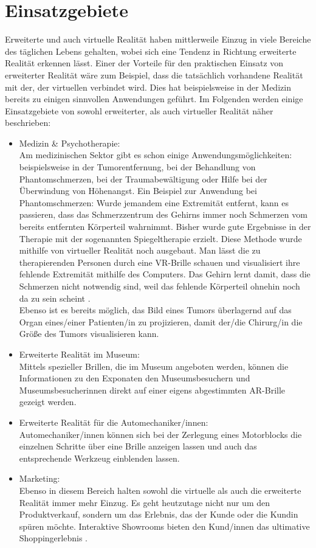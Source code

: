\documentclass[deutsch]{llncs}
\begin{document}
\section{Einsatzgebiete}
Erweiterte und auch virtuelle Realität haben mittlerweile Einzug in viele Bereiche des täglichen Lebens gehalten, wobei sich eine Tendenz in Richtung erweiterte Realität erkennen lässt. Einer der Vorteile für den praktischen Einsatz von erweiterter Realität wäre zum Beispiel, dass die tatsächlich vorhandene Realität mit der, der virtuellen verbindet wird. Dies hat beispielsweise in der Medizin bereits zu einigen sinnvollen Anwendungen geführt. Im Folgenden werden einige Einsatzgebiete von sowohl erweiterter, als auch virtueller Realität näher beschrieben: 
\begin{itemize}
\item Medizin \& Psychotherapie:\\
Am medizinischen Sektor gibt es schon einige Anwendungsmöglichkeiten: beispielsweise in der Tumorentfernung, bei der Behandlung von Phantomschmerzen, bei der Traumabewältigung oder Hilfe bei der Überwindung von Höhenangst. 
Ein Beispiel zur Anwendung bei Phantomschmerzen: Wurde jemandem eine Extremität entfernt, kann es passieren, dass das Schmerzzentrum des Gehirns immer noch Schmerzen vom bereits entfernten Körperteil wahrnimmt. Bisher wurde gute Ergebnisse in der Therapie mit der sogenannten Spiegeltherapie erzielt. Diese Methode wurde mithilfe von virtueller Realität noch ausgebaut. Man lässt die zu therapierenden Personen durch eine VR-Brille schauen und visualisiert ihre fehlende Extremität mithilfe des Computers. Das Gehirn lernt damit, dass die Schmerzen nicht notwendig sind, weil das fehlende Körperteil ohnehin noch da zu sein scheint \cite{}. \\
Ebenso ist es bereits möglich, das Bild eines Tumors überlagernd auf das Organ eines/einer Patienten/in zu projizieren, damit der/die Chirurg/in die Größe des Tumors visualisieren kann.
\item Erweiterte Realität im Museum: \\
Mittels spezieller Brillen, die im Museum angeboten werden, können die Informationen zu den Exponaten den Museumsbesuchern und Museumsbesucherinnen direkt auf einer eigens abgestimmten AR-Brille gezeigt werden. 
\item Erweiterte Realität für die Automechaniker/innen:\\
Automechaniker/innen können sich bei der Zerlegung eines Motorblocks die einzelnen Schritte über eine Brille anzeigen lassen und auch das entsprechende Werkzeug einblenden lassen. 
\item Marketing: \\
Ebenso in diesem Bereich halten sowohl die virtuelle als auch die erweiterte Realität immer mehr Einzug. Es geht heutzutage nicht nur um den Produktverkauf, sondern um das Erlebnis, das der Kunde oder die Kundin spüren möchte. Interaktive Showrooms bieten den Kund/innen das ultimative Shoppingerlebnis \cite{}.


\end{itemize}
\end{document}
